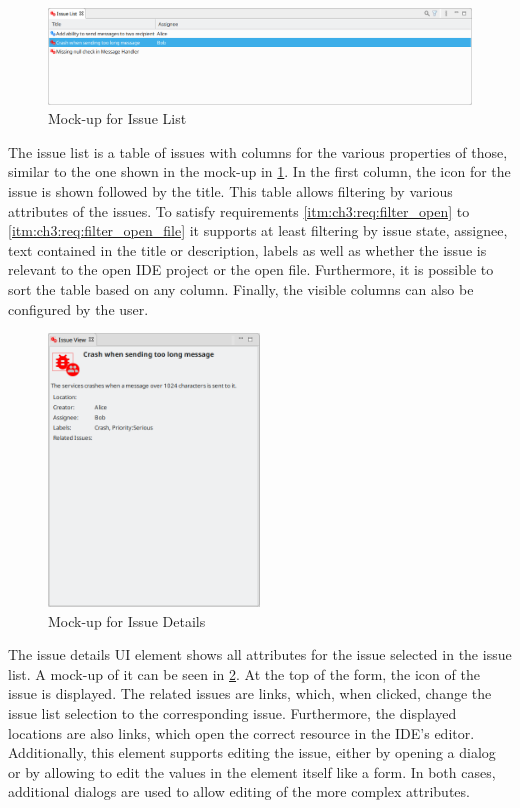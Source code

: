 \begin{figure}[!h]
	\centering
	\includegraphics[width=\textwidth]{graphics/concept_mockup_issueList.png}
	\caption{Mock-up for Issue List}
	\label{fig:c3:mockup_issueList}
\end{figure}
The issue list is a table of issues with columns for the various properties of those, 
similar to the one shown in the mock-up in \cref{fig:c3:mockup_issueList}.
In the first column, the icon for the issue is shown followed by the title.
This table allows filtering by various attributes of the issues.
To satisfy requirements \ref{itm:ch3:req:filter_open} to \ref{itm:ch3:req:filter_open_file} it supports at least filtering
by issue state, assignee, text contained in the title or description, 
labels as well as whether the issue is relevant to the open \gls{IDE} project or the open file.
Furthermore, it is possible to sort the table based on any column. 
Finally, the visible columns can also be configured by the user.

\begin{figure}[!h]
	\centering
	\includegraphics[width=0.5\textwidth]{graphics/concept_mockup_issueDetails.png}
	\caption{Mock-up for Issue Details}
	\label{fig:c3:mockup_issueDetails}
\end{figure}
The issue details \gls{UI} element shows all attributes for the issue selected in the issue list.
A mock-up of it can be seen in \cref{fig:c3:mockup_issueDetails}.
At the top of the form, the icon of the issue is displayed.
The related issues are links, which, when clicked, change the issue list selection to the corresponding issue.
Furthermore, the displayed locations are also links, which open the correct resource in the \gls{IDE}'s editor.
Additionally, this element supports editing the issue, either by opening a dialog or by allowing to edit the values in the element itself like a form.
In both cases, additional dialogs are used to allow editing of the more complex attributes. 


